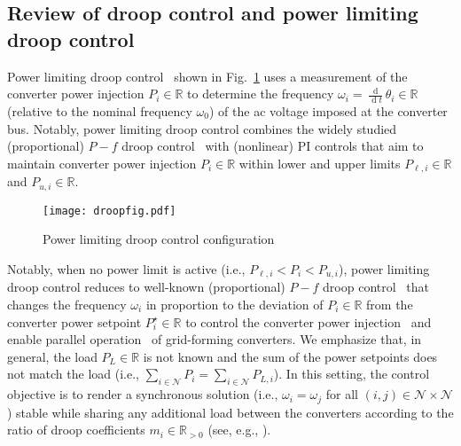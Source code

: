 \documentclass[twocolumn,twoside,journal]{IEEEtran}
\DeclareMathOperator{\diff}{d}
\newcommand{\mc}{\mathcal}
\newcommand{\ddt}{\tfrac{\diff}{\diff \!t}}
\begin{document}
\subsection{Review of droop control and power limiting droop control}
Power limiting droop control~\cite{PL2006,DLK2019} shown in Fig.~\ref{fig:plim} uses a measurement of the converter power injection $P_i \in \mathbb{R}$ to determine the frequency $\omega_i = \ddt \theta_i \in \mathbb{R}$ (relative to the nominal frequency $\omega_0$) of the ac voltage imposed at the converter bus. Notably, power limiting droop control combines the widely studied (proportional) $P-f$ droop control~\cite{CDA1993,RLB2012,SDB2013} with (nonlinear) PI controls that aim to maintain converter power injection $P_i \in \mathbb{R}$ within lower and upper limits $P_{\ell, i} \in \mathbb{R}$ and $P_{u, i} \in \mathbb{R}$. 
%
\begin{figure}[htbp]
    \begin{center}
        \texttt{[image: droopfig.pdf]}
        \caption{Power limiting droop control configuration}%
        \label{fig:plim}
    \end{center}
\end{figure}
%
Notably, when no power limit is active (i.e., $P_{\ell,i} < P_i < P_{u,i}$), power limiting droop control reduces to well-known (proportional) $P-f$ droop control~\cite{CDA1993} that changes the frequency $\omega_i$ in proportion to the deviation of $P_i\in\mathbb{R}$ from the converter power setpoint $P^\star_i\in\mathbb{R}$ to control the converter power injection~\cite[Sec.~IV-C]{RLB2012} and enable parallel operation~\cite{CDA1993} of grid-forming converters. We emphasize that, in general, the load $P_L \in \mathbb{R}$ is not known and the sum of the power setpoints does not match the load (i.e., $\sum_{i\in\mc N} P_i = \sum_{i\in\mc N} P_{L,i}$). In this setting, the control objective is to render a synchronous solution (i.e., $\omega_i=\omega_j$ for all $(i,j) \in \mc N \times \mc N$) stable while sharing any additional load between the converters according to the ratio of droop coefficients $m_i \in \mathbb{R}_{>0}$ (see, e.g., \cite{SDB2013}).
\end{document}
